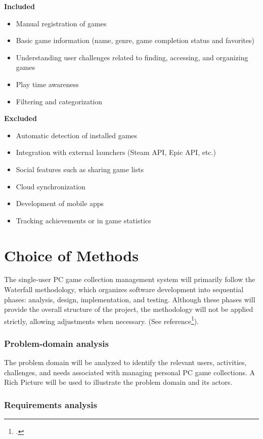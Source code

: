 \documentclass[11pt]{article}
\begin{document}
\textbf{Included}
\begin{itemize}
    \item Manual registration of games
    \item Basic game information (name, genre, game completion status and favorites)
    \item Understanding user challenges related to finding, accessing, and organizing games
    \item Play time awareness
    \item Filtering and categorization
\end{itemize}
\textbf{Excluded}
\begin{itemize}
    \item Automatic detection of installed games
    \item Integration with external launchers (Steam API, Epic API, etc.)
    \item Social features such as sharing game lists
    \item Cloud synchronization
    \item Development of mobile apps
    \item Tracking achievements or in game statistics
\end{itemize}


\newpage
\section{Choice of Methods}

The single-user PC game collection management system will primarily follow the Waterfall methodology, which organizes software development into sequential phases: analysis, design, implementation, and testing. Although these phases will provide the overall structure of the project, the methodology will not be applied strictly, allowing adjustments when necessary. (See reference\footcite{via_methods_2026}).

\subsubsection{Problem-domain analysis }

The problem domain will be analyzed to identify the relevant users, activities, challenges, and needs associated with managing personal PC game collections. A Rich Picture will be used to illustrate the problem domain and its actors.

\subsubsection{Requirements analysis}
\end{document}
